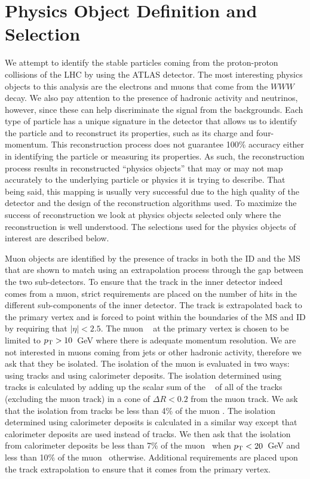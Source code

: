 \section{Physics Object Definition and Selection}
\label{sec:object_selection}
We attempt to identify the stable particles coming from
the proton-proton collisions of the LHC by using the ATLAS detector.
The most interesting physics objects
to this analysis are the electrons and muons
that come from the $WWW$ decay. We also pay attention to 
the presence of hadronic activity and neutrinos, however, since these can
help discriminate the signal from the backgrounds.
Each type of particle has a unique signature in the detector
that allows us to identify the particle and to reconstruct 
its properties, such as its charge and four-momentum. 
This reconstruction process does not guarantee
100\% accuracy either in identifying the particle or measuring its 
properties. As such, the reconstruction process results in reconstructed
``physics objects'' that may or may not map accurately 
to the underlying particle or physics it is trying to describe. That 
being said, this mapping is usually very successful due to the high quality
of the detector and the design of the reconstruction algorithms used.
To maximize the success of reconstruction we look at physics
objects selected only where the reconstruction is well understood.
The selections used for the physics objects of interest are described below.


Muon objects are identified by the presence of tracks in both 
the ID and the MS that are shown 
to match using an extrapolation process through the gap between the
two sub-detectors. To ensure that the track in the inner detector
indeed comes from a muon, strict requirements are placed
on the number of hits in the different sub-components of the inner detector.
The track is extrapolated back to the primary vertex and is forced
to point within the boundaries of the MS and ID
by requiring that $|\eta|<2.5$.
The muon \pt~ at the primary vertex is chosen to be limited to $p_{\mathrm{T}} > 10$~GeV
where there is adequate momentum resolution. We are not interested in 
muons coming from jets or other hadronic activity, therefore we
ask that they be isolated. The isolation of the muon is evaluated
in two ways: using tracks and using calorimeter deposits.
The isolation determined using tracks is calculated by adding
up the scalar sum of the \pt~ of all of the tracks (excluding
the muon track) in a cone of $\Delta R< 0.2$ from the muon track.
We ask that the isolation from tracks be less than 4\% of the muon \pt.
The isolation determined using calorimeter deposits is calculated in
a similar way except that calorimeter deposits are used instead of tracks.
We then ask that the isolation from calorimeter deposits 
be less than 7\% of the muon \pt~when $p_{\mathrm{T}} < 20$~GeV and 
less than 10\% of the muon \pt~otherwise. Additional requirements
are placed upon the track extrapolation to ensure that it comes from
the primary vertex.


